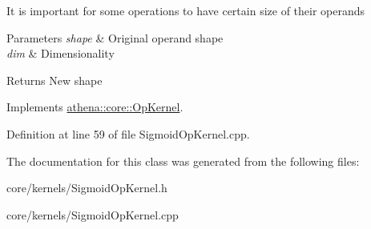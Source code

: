It is important for some operations to have certain size of their operands 
\begin{DoxyParams}{Parameters}
{\em shape} & Original operand shape \\
\hline
{\em dim} & Dimensionality \\
\hline
\end{DoxyParams}
\begin{DoxyReturn}{Returns}
New shape 
\end{DoxyReturn}


Implements \mbox{\hyperlink{classathena_1_1core_1_1_op_kernel_a762e541463ffd089b47a8e6755c30fe1}{athena\+::core\+::\+Op\+Kernel}}.



Definition at line 59 of file Sigmoid\+Op\+Kernel.\+cpp.



The documentation for this class was generated from the following files\+:\begin{DoxyCompactItemize}
\item 
core/kernels/Sigmoid\+Op\+Kernel.\+h\item 
core/kernels/Sigmoid\+Op\+Kernel.\+cpp\end{DoxyCompactItemize}
